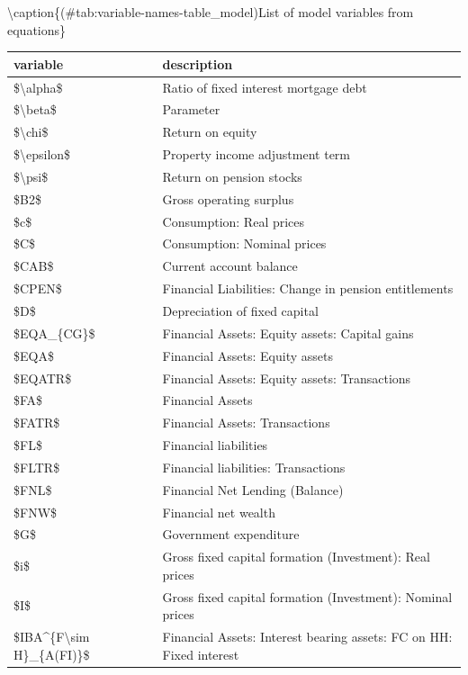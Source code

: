 \documentclass[
]{book}
\begin{document}
\textbackslash caption\{(\#tab:variable-names-table\_model)List of model variables from equations\}
\centering
\fontsize{10}{12}\selectfont

\begin{tabular}[t]{l|l}
\hline
variable & description\\
\hline
\$\textbackslash{}alpha\$ & Ratio of fixed interest mortgage debt\\
\hline
\$\textbackslash{}beta\$ & Parameter\\
\hline
\$\textbackslash{}chi\$ & Return on equity\\
\hline
\$\textbackslash{}epsilon\$ & Property income adjustment term\\
\hline
\$\textbackslash{}psi\$ & Return on pension stocks\\
\hline
\$B2\$ & Gross operating surplus\\
\hline
\$c\$ & Consumption: Real prices\\
\hline
\$C\$ & Consumption: Nominal prices\\
\hline
\$CAB\$ & Current account balance\\
\hline
\$CPEN\$ & Financial Liabilities: Change in pension entitlements\\
\hline
\$D\$ & Depreciation of fixed capital\\
\hline
\$EQA\_\{CG\}\$ & Financial Assets: Equity assets: Capital gains\\
\hline
\$EQA\$ & Financial Assets: Equity assets\\
\hline
\$EQATR\$ & Financial Assets: Equity assets: Transactions\\
\hline
\$FA\$ & Financial Assets\\
\hline
\$FATR\$ & Financial Assets: Transactions\\
\hline
\$FL\$ & Financial liabilities\\
\hline
\$FLTR\$ & Financial liabilities: Transactions\\
\hline
\$FNL\$ & Financial Net Lending (Balance)\\
\hline
\$FNW\$ & Financial net wealth\\
\hline
\$G\$ & Government expenditure\\
\hline
\$i\$ & Gross fixed capital formation (Investment): Real prices\\
\hline
\$I\$ & Gross fixed capital formation (Investment): Nominal prices\\
\hline
\$IBA\textasciicircum{}\{F\textbackslash{}sim H\}\_\{A(FI)\}\$ & Financial Assets: Interest bearing assets: FC on HH: Fixed interest\\

\end{tabular}
\end{document}
